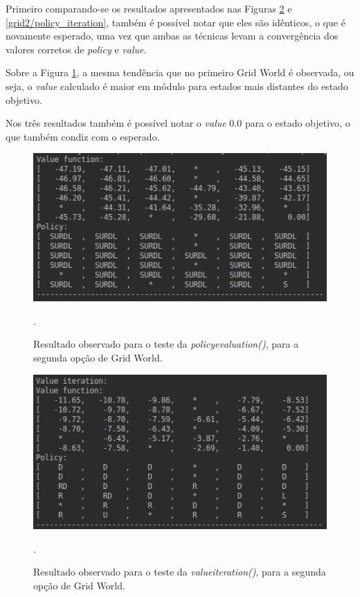 \documentclass[conference]{IEEEtran}
\begin{document}
Primeiro comparando-se os resultados apresentados nas Figuras \ref{grid2/value_iteration} e \ref{grid2/policy_iteration}, também é possível notar que eles são idênticos, o que é novamente esperado, uma vez que ambas as técnicas levam a convergência dos valores corretos de \textit{policy} e \textit{value}.

Sobre a Figura \ref{grid2/policy_evaluation}, a mesma tendência que no primeiro Grid World é observada, ou seja, o \textit{value} calculado é maior em módulo para estados mais distantes do estado objetivo.

Nos três resultados também é possível notar o \textit{value} 0.0 para o estado objetivo, o que também condiz com o esperado. 

\begin{figure}[htbp]
\centering
\centerline{\includegraphics[scale=0.5]{imagens/grid2/policy_evaluation.png}}
\caption{Resultado observado para o teste da \textit{policy\underline{\space}evaluation()}, para a segunda opção de Grid World.}.
\label{grid2/policy_evaluation}
\end{figure}

\begin{figure}[htbp]
\centering
\centerline{\includegraphics[scale=0.5]{imagens/grid2/value_iteration.png}}
\caption{Resultado observado para o teste da \textit{value\underline{\space}iteration()}, para a segunda opção de Grid World.}.
\label{grid2/value_iteration}
\end{figure}
\end{document}
